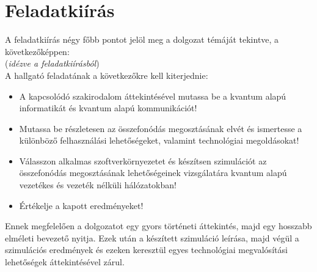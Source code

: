 \section{Feladatkiírás}
A feladatkiírás négy főbb pontot jelöl meg a dolgozat témáját tekintve, a következőképpen:\\
(\textit{idézve a feladatkiírásból})\\

A hallgató feladatának a következőkre kell kiterjednie:
\begin{itemize}
\item A kapcsolódó szakirodalom áttekintésével mutassa be a kvantum alapú informatikát és
kvantum alapú kommunikációt!
\item Mutassa be részletesen az összefonódás megosztásának elvét és ismertesse a különböző
felhasználási lehetőségeket, valamint technológiai megoldásokat!
\item Válasszon alkalmas szoftverkörnyezetet és készítsen szimulációt az összefonódás
megosztásának lehetőségeinek vizsgálatára kvantum alapú vezetékes és vezeték nélküli
hálózatokban!
\item Értékelje a kapott eredményeket!
\end{itemize}
Ennek megfelelően a dolgozatot egy gyors történeti áttekintés, majd egy hosszabb elméleti bevezető nyitja. Ezek után a készített szimuláció leírása, majd végül a szimulációs eredmények és ezeken keresztül egyes technológiai megvalósítási lehetőségek áttekintésével zárul.



